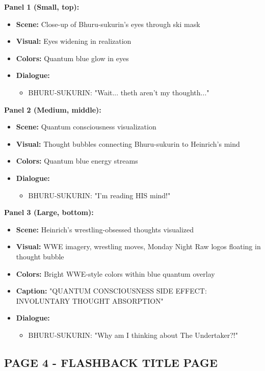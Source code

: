 \documentclass[12pt,a4paper]{article}
\begin{document}
\textbf{Panel 1 (Small, top):}
\begin{itemize}
\item \textbf{Scene:} Close-up of Bhuru-sukurin's eyes through ski mask
\item \textbf{Visual:} Eyes widening in realization
\item \textbf{Colors:} Quantum blue glow in eyes
\item \textbf{Dialogue:}
\begin{itemize}
\item BHURU-SUKURIN: "Wait... theth aren't my thoughth..."
\end{itemize}
\end{itemize}

\textbf{Panel 2 (Medium, middle):}
\begin{itemize}
\item \textbf{Scene:} Quantum consciousness visualization
\item \textbf{Visual:} Thought bubbles connecting Bhuru-sukurin to Heinrich's mind
\item \textbf{Colors:} Quantum blue energy streams
\item \textbf{Dialogue:}
\begin{itemize}
\item BHURU-SUKURIN: "I'm reading HIS mind!"
\end{itemize}
\end{itemize}

\textbf{Panel 3 (Large, bottom):}
\begin{itemize}
\item \textbf{Scene:} Heinrich's wrestling-obsessed thoughts visualized
\item \textbf{Visual:} WWE imagery, wrestling moves, Monday Night Raw logos floating in thought bubble
\item \textbf{Colors:} Bright WWE-style colors within blue quantum overlay
\item \textbf{Caption:} "QUANTUM CONSCIOUSNESS SIDE EFFECT: INVOLUNTARY THOUGHT ABSORPTION"
\item \textbf{Dialogue:}
\begin{itemize}
\item BHURU-SUKURIN: "Why am I thinking about The Undertaker?!"
\end{itemize}
\end{itemize}

\subsection{PAGE 4 - FLASHBACK TITLE PAGE}
\end{document}
